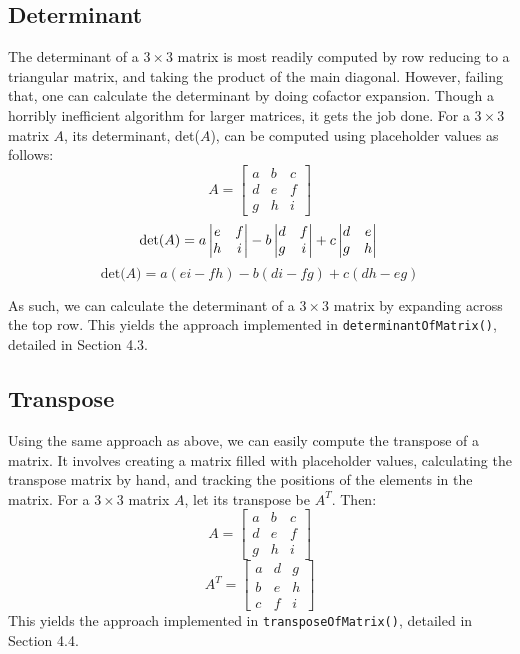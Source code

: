 \documentclass[12pt]{article}
\begin{document}
\subsection{Determinant}
The determinant of a $3\times3$ matrix is most readily computed by row reducing to a triangular matrix, and taking the product of the main diagonal. However, failing that, one can calculate the determinant by doing cofactor expansion. Though a horribly inefficient algorithm for larger matrices, it gets the job done. For a $3\times3$ matrix $A$, its determinant, det($A$), can be computed using placeholder values as follows:
\[
A =
\begin{bmatrix}
    a & b & c \\
    d & e & f \\
    g & h & i
\end{bmatrix}
\]
\begin{equation*}
\text{det($A$)} =
  a\begin{vmatrix}
  e & f\\
  h & i
  \end{vmatrix}  
  -b\begin{vmatrix}
  d & f\\
  g & i
  \end{vmatrix}  
  +c\begin{vmatrix}
  d & e\\
  g & h
  \end{vmatrix}\\\\
\end{equation*}
\begin{equation}
\text{det($A$)} =
a(ei-fh)-b(di-fg)+c(dh-eg)
\end{equation}

As such, we can calculate the determinant of a $3\times3$ matrix by expanding across the top row. This yields the approach implemented in \texttt{determinantOfMatrix()}, detailed in Section 4.3.

\subsection{Transpose}
Using the same approach as above, we can easily compute the transpose of a matrix. It involves creating a matrix filled with placeholder values, calculating the transpose matrix by hand, and tracking the positions of the elements in the matrix. For a $3\times3$ matrix $A$, let its transpose be $A^T$. Then:
\[
A =
\begin{bmatrix}
    a & b & c \\
    d & e & f \\
    g & h & i
\end{bmatrix}
\]
\begin{equation}
A^T =
    \begin{bmatrix}
    a & d & g \\
    b & e & h \\
    c & f & i
\end{bmatrix}
\end{equation}
This yields the approach implemented in \texttt{transposeOfMatrix()}, detailed in Section 4.4.
\end{document}
